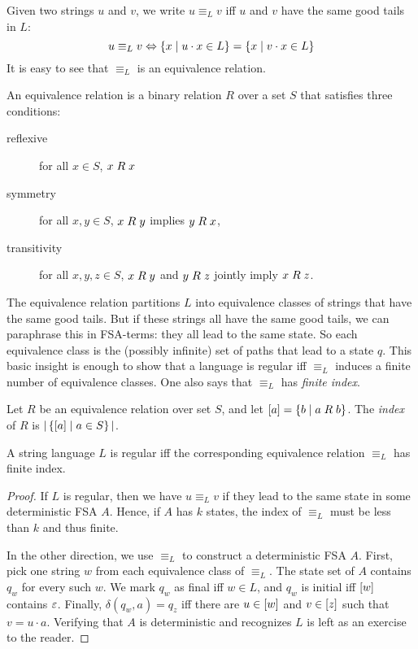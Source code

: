 Given two strings $u$ and $v$, we write $u \equiv_L v$ iff $u$ and $v$ have the same good tails in $L$:
\[
    u \equiv_L v \Leftrightarrow \setof{ x \mid u \cdot x \in L } = \setof{ x \mid v \cdot x \in L}
\]
It is easy to see that $\equiv_L$ is an equivalence relation.
%
\begin{techinfo}
    An equivalence relation is a binary relation $R$ over a set $S$ that satisfies three conditions:
    \begin{description}
        \item[reflexive] for all $x \in S$, $\binrel{R}{x}{x}$
        \item[symmetry] for all $x, y \in S$, $\binrel{R}{x}{y}$ implies $\binrel{R}{y}{x}$, 
        \item[transitivity] for all $x, y, z \in S$, $\binrel{R}{x}{y}$ and $\binrel{R}{y}{z}$ jointly imply $\binrel{R}{x}{z}$.
    \end{description}
\end{techinfo}
%
The equivalence relation partitions $L$ into equivalence classes of strings that have the same good tails.
But if these strings all have the same good tails, we can paraphrase this in FSA-terms: they all lead to the same state. 
So each equivalence class is the (possibly infinite) set of paths that lead to a state $q$.
This basic insight is enough to show that a language is regular iff $\equiv_L$ induces a finite number of equivalence classes.
One also says that $\equiv_L$ has \emph{finite index}.
%
\begin{definition}[Index]
    Let $R$ be an equivalence relation over set $S$, and let $\eclass{a} = \setof{ b \mid \binrel{R}{a}{b} }$.
    The \emph{index} of $R$ is $\cardof{\setof{ \eclass{a} \mid a \in S}}$.
\end{definition}
%
\begin{theorem}
    A string language $L$ is regular iff the corresponding equivalence relation $\equiv_L$ has finite index.
\end{theorem}
%
\begin{proof}
    If $L$ is regular, then we have $u \equiv_L v$ if they lead to the same state in some deterministic FSA $A$.
    Hence, if $A$ has $k$ states, the index of $\equiv_L$ must be less than $k$ and thus finite.

    In the other direction, we use $\equiv_L$ to construct a deterministic FSA $A$.
    First, pick one string $w$ from each equivalence class of $\equiv_L$.
    The state set of $A$ contains $q_w$ for every such $w$.
    We mark $q_w$ as final iff $w \in L$, and $q_w$ is initial iff $\eclass{w}$ contains $\emptystring$.
    Finally, $\delta(q_w,a) = q_z$ iff there are $u \in \eclass{w}$ and $v \in \eclass{z}$ such that $v = u \cdot a$.
    Verifying that $A$ is deterministic and recognizes $L$ is left as an exercise to the reader.
\end{proof}
%

